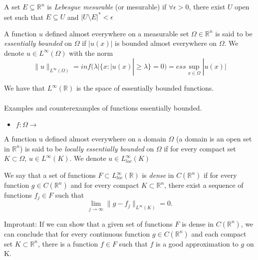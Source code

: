 \documentclass[../main.tex]{subfiles}
\begin{document}
\begin{definition}
A set $E\subseteq \mathbb{R}^n $ is \emph{Lebesgue mesurable} (or mesurable) if $\forall \epsilon >0$, there exist $U$ open set such that $E \subseteq U$ and $|U\setminus E|^* < \epsilon $
\end{definition}

\begin{definition}
	A function $u$ defined almost everywhere on a measurable set $\Omega \in \mathbb{R}^n$ is said to be \emph{essentially bounded} on $\Omega$ if $|u(x)|$ is bounded almost everywhere on $\Omega$. We denote $u\in L^{\infty}(\Omega)$ with the norm $$\|u\|_{L^{\infty}(\Omega)}= inf(\lambda | \{ x : |u(x)| \geq \lambda \} = 0 ) = ess \sup_{x\in \Omega} |u(x)|$$

\end{definition}

\noindent We have that $L^{\infty}(\mathbb{R})$ is the space of essentially bounded functions.
\\ \\ 
Examples and counterexamples of functions essentially bounded. 
\begin{itemize}
\item $f:\Omega \rightarrow $
\end{itemize}

\begin{definition}
	A function u defined almost everywhere on a domain $\Omega$ (a domain is an open set in $\mathbb{R}^n$) is said to be\emph{ locally essentially bounded }on $\Omega$ if for every compact set $K\subset \Omega$, $u\in L^{\infty}(K)$. We denote $u\in L_{loc}^{\infty}(K)$
\end{definition}

\begin{definition}We say that a set of functions $F\subset L_{loc}^{\infty}(\mathbb{R})$ is \emph{dense} in $C(\mathbb{R}^n)$ if for every function $g\in C(\mathbb{R}^n)$ and for every compact $K\subset \mathbb{R}^n$, there exist a sequence of functions $f_j\in F$ such that $$\lim_{j\rightarrow\infty} \|g-f_j\|_{L^\infty(K)}=0.$$ 
\end{definition}
\noindent Improtant: If we can show that a given set of functions $F$ is dense in $C(\mathbb{R}^n)$, we can conclude that for every continuous function $g \in C(\mathbb{R}^n) $ and each compact set $K \subset \mathbb{R}^n$, there is a function $f \in F$ such that $f$ is a good approximation to $g$ on K.
\end{document}
